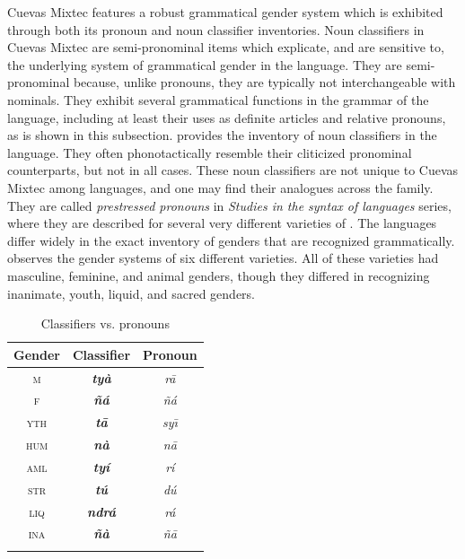 \documentclass[output=paper,modfonts,nonflat]{langsci/langscibook}
\begin{document}
Cuevas Mixtec features a robust grammatical gender system which is exhibited through both its pronoun and noun classifier inventories.  Noun classifiers in Cuevas Mixtec are semi-pronominal items which explicate, and are sensitive to, the underlying system of grammatical gender in the language.  They are semi-pronominal because, unlike pronouns, they are typically not interchangeable with nominals.  They exhibit several grammatical functions in the grammar of the language, including at least their uses as definite articles and relative pronouns, as is shown in this subsection.  provides the inventory of noun classifiers in the language. They often phonotactically resemble their cliticized pronominal counterparts, but not in all cases.  These noun classifiers are not unique to Cuevas Mixtec among  languages, and one may find their analogues across the family.  They are called \textit{prestressed pronouns} in  \textit{Studies in the syntax of  languages} series, where they are described for several very different varieties of .  The  languages differ widely in the exact inventory of genders that are recognized grammatically.  \citet{Macri1983} observes the gender systems of six different  varieties.  All of these varieties had masculine, feminine, and animal genders, though they differed in recognizing inanimate, youth, liquid, and sacred genders.

\begin{table}
\begin{tabularx}{.5\textwidth}{CCC} 
\lsptoprule
Gender & Classifier & Pronoun\\
\midrule
\textsc{m} & \textit{\textbf{ty\`a}} & \textit{r\=a} \\
\textsc{f} & \textit{\textbf{\~n\'a}} & \textit{\~n\'a} \\
\textsc{yth} & \textit{\textbf{t\=a}} & \textit{sy\=\i} \\
\textsc{hum} & \textit{\textbf{n\`a}} & \textit{n\=a} \\
\textsc{aml} & \textit{\textbf{ty\'i}} & \textit{r\'i} \\
\textsc{str} & \textit{\textbf{t\'u}} & \textit{d\'u} \\
\textsc{liq} & \textit{\textbf{ndr\'a}} & \textit{r\'a} \\
\textsc{ina} & \textit{\textbf{\~n\`a}} & \textit{\~n\=a} \\
\lspbottomrule
\end{tabularx}
\caption{Classifiers vs. pronouns}
\label{tab:cisneros:2}
\end{table}
\end{document}
